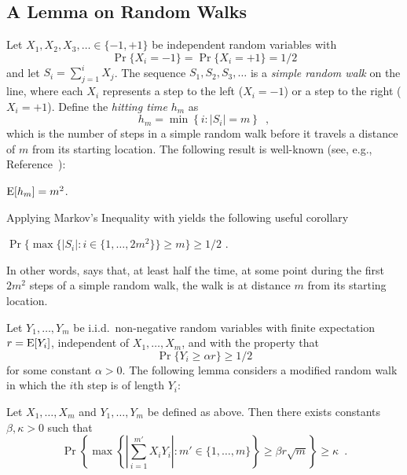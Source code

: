 \documentclass[acmtoalg]{acmtrans2m}
\begin{document}

\subsection{A Lemma on Random Walks}

Let $X_1,X_2,X_3,\ldots\in\{-1,+1\}$ be independent random variables with
\[ \Pr\{X_i=-1\}=\Pr\{X_i=+1\}=1/2
\]
and let $S_i=\sum_{j=1}^i X_j$.  The sequence $S_1,S_2,S_3,\ldots$ is
a \emph{simple random walk} on the line, where each $X_i$ represents a
step to the left ($X_i=-1$) or a step to the right ($X_i=+1$).
Define the \emph{hitting time} $h_m$ as
\[
   h_m = \min\left\{i:|S_i|= m\right\} \enspace ,
\]
which is the number of steps in a simple random walk
before it travels a distance of $m$ from its starting location.
The following result is well-known (see, e.g.,
Reference~\cite{mu05}):
\begin{lem}
$\mathrm{E}[h_m] = m^2$.
\end{lem}
Applying Markov's Inequality with  yields the
following useful corollary
\begin{cor}
$\Pr\{\max\{|S_i|:i\in\{1,\ldots,2m^2\}\} \ge m\} \ge 1/2$ .
\end{cor}
In other words,  says that, at least half the
time, at some point
during the first $2m^2$ steps of a simple random walk, the 
walk is at distance $m$ from its starting
location.

Let $Y_1,\ldots,Y_m$ be i.i.d.\
non-negative random variables with finite expectation $r=\mathrm{E}[Y_i]$,
independent of $X_1,\ldots,X_m$, and with the
property that 
\[ \Pr\{Y_i \ge \alpha r\} \ge 1/2 \]
for some constant
$\alpha > 0$.  The following lemma considers a modified random walk in
which the $i$th step is of length $Y_i$:
\begin{lem}
Let $X_1,\ldots,X_m$ and $Y_1,\ldots,Y_m$ be defined as above.  Then
there exists constants $\beta,\kappa>0$ such that
\[
  \Pr\left\{\max\left\{
           \left|\sum_{i=1}^{m'} X_iY_i\right| : m'\in\{1,\ldots,m\}\right\}
            \ge \beta r\sqrt{m}\right\} 
     \ge \kappa \enspace .
\]
\end{lem}
\end{document}
